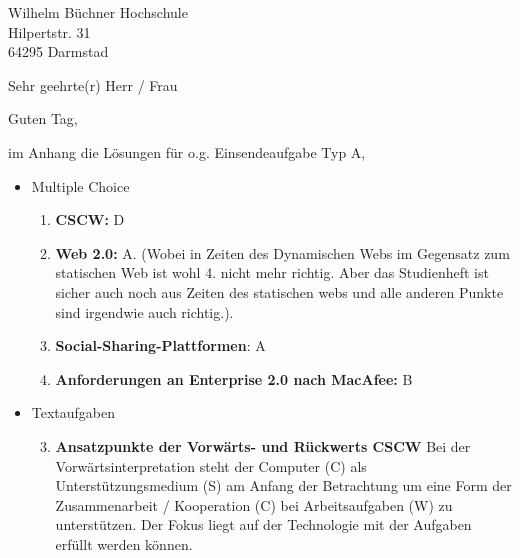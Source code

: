 \documentclass[
    version=last,           %
    DIV=13,                 %
    BCOR=0mm,               %
    paper=a4,               %
    fontsize=12pt,          %
    firsthead=on,           %
    firstfoot=on,           %
    pagenumber=on,i         %
    parskip=half,           %
    enlargefirstpage=,      %
    firsthead=on,           %
    fromrule=afteraddress,  %
    priority=off,           %
    backaddress=true,       %
    refline=dateright,      %
	fromalign=right,	    %
    fromemail=on,i          %
    fromurl=on,             %
    frombank=on,
    fromphone=on,           %
    frommobilephone=on      %
    fromlogo=on,            %
    addrfield=on,           %
    subject=untitled,  %
    foldmarks=off,          %
    numericaldate=off,      %
	pagenumber=right,	        %
	parskip=half,	        %
    headsep=false,          %
    footsepline=true,       %
    foldmarks=off,		    %
	]{scrlttr2}
\begin{document}

\begin{letter} {Wilhelm Büchner Hochschule \\
Hilpertstr. 31\\
64295 Darmstad}



\opening{Sehr geehrte(r) Herr / Frau}

Guten Tag,

im Anhang die Lösungen für o.g. Einsendeaufgabe Typ A,
\\
\begin{itemize}
    \item Multiple Choice
        \begin{enumerate}
        \item \textbf{CSCW:} D
        \item \textbf{Web 2.0:} A. (Wobei in Zeiten des Dynamischen  Webs im
            Gegensatz zum statischen Web ist wohl 4. nicht mehr richtig.
            Aber das Studienheft ist sicher auch noch aus Zeiten des statischen
            webs und alle anderen Punkte sind irgendwie auch richtig.).
       \item \textbf{Social-Sharing-Plattformen}: A
       \item \textbf{Anforderungen an Enterprise 2.0 nach MacAfee:} B


        \end{enumerate}
            \vspace{1cm}
    \item Textaufgaben
        \begin{enumerate}
        \setcounter{enumi}{2}
    \item \textbf{Ansatzpunkte der Vorwärts- und Rückwerts CSCW}
        Bei der Vorwärtsinterpretation steht der Computer (C) als
        Unterstützungsmedium (S) am Anfang der Betrachtung um eine Form
        der Zusammenarbeit / Kooperation (C) bei Arbeitsaufgaben (W) zu
        unterstützen. Der Fokus liegt auf der Technologie mit der Aufgaben
        erfüllt werden können.\\


\end{enumerate}
\end{itemize}
\end{letter}
\end{document}

